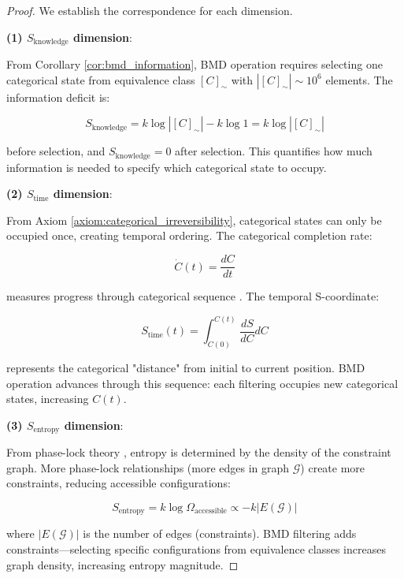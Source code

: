 \documentclass[12pt,a4paper]{article}
\begin{document}
\begin{proof}
We establish the correspondence for each dimension.

\textbf{(1) $S_{\text{knowledge}}$ dimension}:

From Corollary \ref{cor:bmd_information}, BMD operation requires selecting one categorical state from equivalence class $[C]_{\sim}$ with $|[C]_{\sim}| \sim 10^6$ elements. The information deficit is:

\begin{equation}
S_{\text{knowledge}} = k \log |[C]_{\sim}| - k \log 1 = k \log |[C]_{\sim}|
\end{equation}

before selection, and $S_{\text{knowledge}} = 0$ after selection. This quantifies how much information is needed to specify which categorical state to occupy.

\textbf{(2) $S_{\text{time}}$ dimension}:

From Axiom \ref{axiom:categorical_irreversibility}, categorical states can only be occupied once, creating temporal ordering. The categorical completion rate:

\begin{equation}
\dot{C}(t) = \frac{dC}{dt}
\end{equation}

measures progress through categorical sequence \cite{sachikonye2024gibbs}. The temporal S-coordinate:

\begin{equation}
S_{\text{time}}(t) = \int_{C(0)}^{C(t)} \frac{dS}{dC} dC
\end{equation}

represents the categorical "distance" from initial to current position. BMD operation advances through this sequence: each filtering occupies new categorical states, increasing $C(t)$.

\textbf{(3) $S_{\text{entropy}}$ dimension}:

From phase-lock theory \cite{sachikonye2024gibbs}, entropy is determined by the density of the constraint graph. More phase-lock relationships (more edges in graph $\mathcal{G}$) create more constraints, reducing accessible configurations:

\begin{equation}
S_{\text{entropy}} = k \log \Omega_{\text{accessible}} \propto -k |E(\mathcal{G})|
\end{equation}

where $|E(\mathcal{G})|$ is the number of edges (constraints). BMD filtering adds constraints—selecting specific configurations from equivalence classes increases graph density, increasing entropy magnitude.


\end{proof}
\end{document}
